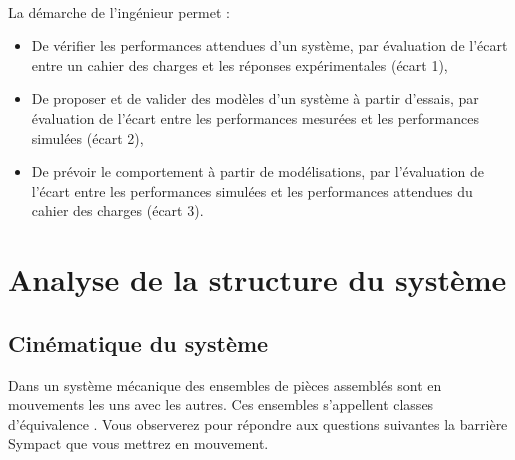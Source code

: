 

 \\

\graphicspath{{../../../img/}}
\begin{center}
\def\svgwidth{\columnwidth}

\end{center}

La démarche de l’ingénieur permet :
\begin{itemize}
 \item De vérifier les performances attendues d’un système, par évaluation de l’écart entre un cahier des charges et les réponses expérimentales (écart 1),
 \item De proposer et de valider des modèles d’un système à partir d’essais, par évaluation de l’écart entre les performances mesurées et les performances simulées (écart 2),
 \item De prévoir le comportement à partir de modélisations, par l’évaluation de l’écart entre les performances simulées et les performances attendues du cahier des charges (écart 3).
\end{itemize}



\newpage

\section{Analyse de la structure du système}

\subsection{Cinématique du système}

Dans un système mécanique des ensembles de pièces assemblés sont en mouvements les uns avec les autres. Ces ensembles s'appellent \og classes d'équivalence \fg. Vous observerez pour répondre aux questions suivantes la barrière Sympact que vous mettrez en mouvement.


